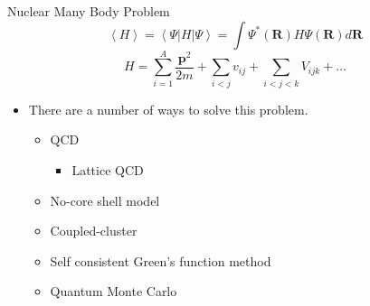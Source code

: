 \documentclass{beamer}
\newcommand{\red}[1]{{\color{red}{#1}}}
\newcommand{\ket}[1]{\left| #1 \right>}
\newcommand{\bra}[1]{\left< #1 \right|}
\begin{document}
\begin{frame}{Nuclear Many Body Problem}
   \begin{equation*}
      \left<H\right> = \bra{\Psi}H\ket{\Psi} = \int\Psi^*(\bm{R})H\Psi(\bm{R}) d\bm{R}
   \end{equation*}
   \begin{equation*}
      H = \sum\limits_{i=1}^A \frac{\bm{p}^2}{2m} + \sum\limits_{i<j} v_{ij} + \sum\limits_{i<j<k} V_{ijk} + \ldots
   \end{equation*}
   \begin{itemize}
      \item There are a number of ways to solve this problem.
      \begin{itemize}
         \item QCD
         \begin{itemize}
            \item Lattice QCD
         \end{itemize}
         \item No-core shell model
         \item Coupled-cluster
         \item Self consistent Green's function method
         \item Quantum Monte Carlo
      \end{itemize}
   \end{itemize}
   \red{Should I have a slide for each method or should I have some popup information about each and just describe them here?}
   \\\red{Can they be clumped into different styles and talked about together on slides?}
\end{frame}

\end{document}

